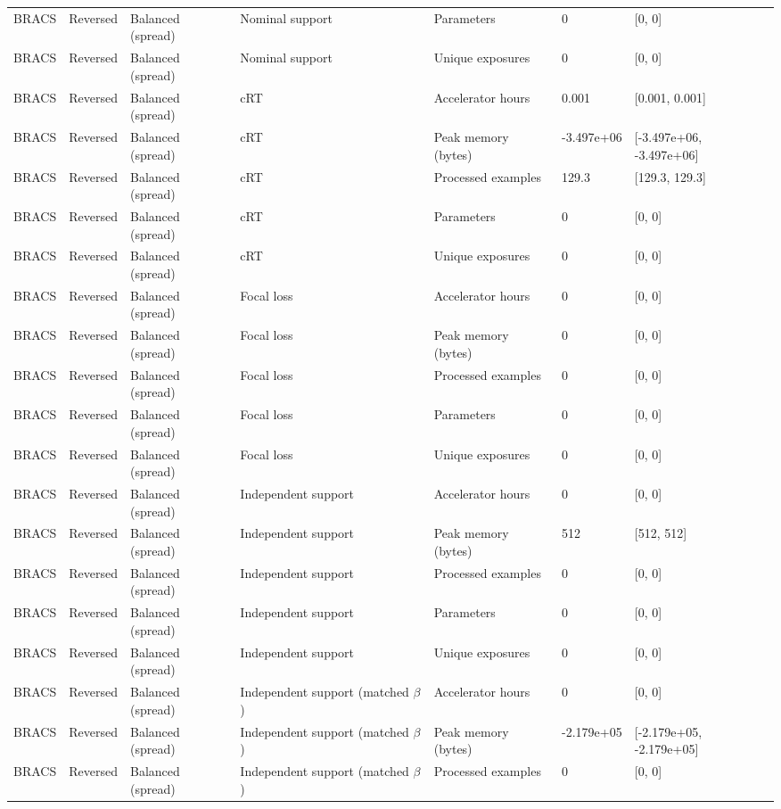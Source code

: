 \begin{longtable}{lllllll}
BRACS & Reversed & Balanced (spread) & Nominal support & Parameters & 0 & [0, 0] \\
BRACS & Reversed & Balanced (spread) & Nominal support & Unique exposures & 0 & [0, 0] \\
BRACS & Reversed & Balanced (spread) & cRT & Accelerator hours & 0.001 & [0.001, 0.001] \\
BRACS & Reversed & Balanced (spread) & cRT & Peak memory (bytes) & -3.497e+06 & [-3.497e+06, -3.497e+06] \\
BRACS & Reversed & Balanced (spread) & cRT & Processed examples & 129.3 & [129.3, 129.3] \\
BRACS & Reversed & Balanced (spread) & cRT & Parameters & 0 & [0, 0] \\
BRACS & Reversed & Balanced (spread) & cRT & Unique exposures & 0 & [0, 0] \\
BRACS & Reversed & Balanced (spread) & Focal loss & Accelerator hours & 0 & [0, 0] \\
BRACS & Reversed & Balanced (spread) & Focal loss & Peak memory (bytes) & 0 & [0, 0] \\
BRACS & Reversed & Balanced (spread) & Focal loss & Processed examples & 0 & [0, 0] \\
BRACS & Reversed & Balanced (spread) & Focal loss & Parameters & 0 & [0, 0] \\
BRACS & Reversed & Balanced (spread) & Focal loss & Unique exposures & 0 & [0, 0] \\
BRACS & Reversed & Balanced (spread) & Independent support & Accelerator hours & 0 & [0, 0] \\
BRACS & Reversed & Balanced (spread) & Independent support & Peak memory (bytes) & 512 & [512, 512] \\
BRACS & Reversed & Balanced (spread) & Independent support & Processed examples & 0 & [0, 0] \\
BRACS & Reversed & Balanced (spread) & Independent support & Parameters & 0 & [0, 0] \\
BRACS & Reversed & Balanced (spread) & Independent support & Unique exposures & 0 & [0, 0] \\
BRACS & Reversed & Balanced (spread) & Independent support (matched $\beta$) & Accelerator hours & 0 & [0, 0] \\
BRACS & Reversed & Balanced (spread) & Independent support (matched $\beta$) & Peak memory (bytes) & -2.179e+05 & [-2.179e+05, -2.179e+05] \\
BRACS & Reversed & Balanced (spread) & Independent support (matched $\beta$) & Processed examples & 0 & [0, 0] \\

\end{longtable}
